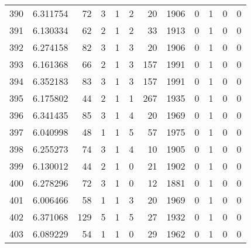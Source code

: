 \begin{tabular}{lrrrrrrrrrrr}
390 &  6.311754 &   72 &      3 &        1 &      2 &              20 &  1906 &               0 &               1 &               0 &               0 \\
391 &  6.130334 &   62 &      2 &        1 &      2 &              33 &  1913 &               0 &               1 &               0 &               0 \\
392 &  6.274158 &   82 &      3 &        1 &      3 &              20 &  1906 &               0 &               1 &               0 &               0 \\
393 &  6.161368 &   66 &      2 &        1 &      3 &             157 &  1991 &               0 &               1 &               0 &               0 \\
394 &  6.352183 &   83 &      3 &        1 &      3 &             157 &  1991 &               0 &               1 &               0 &               0 \\
395 &  6.175802 &   44 &      2 &        1 &      1 &             267 &  1935 &               0 &               1 &               0 &               0 \\
396 &  6.341435 &   85 &      3 &        1 &      4 &              20 &  1969 &               0 &               1 &               0 &               0 \\
397 &  6.040998 &   48 &      1 &        1 &      5 &              57 &  1975 &               0 &               1 &               0 &               0 \\
398 &  6.255273 &   74 &      3 &        1 &      4 &              10 &  1905 &               0 &               1 &               0 &               0 \\
399 &  6.130012 &   44 &      2 &        1 &      0 &              21 &  1902 &               0 &               1 &               0 &               0 \\
400 &  6.278296 &   72 &      3 &        1 &      0 &              12 &  1881 &               0 &               1 &               0 &               0 \\
401 &  6.006466 &   58 &      1 &        1 &      3 &              20 &  1969 &               0 &               1 &               0 &               0 \\
402 &  6.371068 &  129 &      5 &        1 &      5 &              27 &  1932 &               0 &               1 &               0 &               0 \\
403 &  6.089229 &   54 &      1 &        1 &      0 &              29 &  1962 &               0 &               1 &               0 &               0 \\

\end{tabular}
